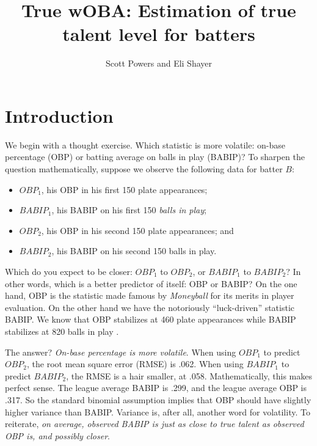 \documentclass[11pt]{article}
\title{True wOBA: Estimation of true talent level for batters}
\author{Scott Powers and Eli Shayer}
\begin{document}
\maketitle

\section{Introduction}
\label{sec-intro}

We begin with a thought exercise. Which statistic is more volatile:
on-base percentage (OBP) or batting average on balls in play (BABIP)? To
sharpen the question mathematically, suppose we observe the following data for
batter $B$:
\begin{itemize}
    \item $OBP_1$, his OBP in his first 150 plate appearances;
    \item $BABIP_1$, his BABIP on his first 150 {\it balls in play};
    \item $OBP_2$, his OBP in his second 150 plate appearances; and
    \item $BABIP_2$, his BABIP on his second 150 balls in play.
\end{itemize}
Which do you expect to be closer: $OBP_1$ to $OBP_2$, or $BABIP_1$ to
$BABIP_2$? In other words, which is a better predictor of itself: OBP or BABIP?
On the one hand, OBP is the statistic made famous by {\it Moneyball} for its
merits in player evaluation. On the other hand we have the notoriously
``luck-driven'' statistic BABIP. We know that OBP stabilizes at 460 plate
appearances while BABIP stabilizes at 820 balls in play \citep{Carleton12}.

The answer? {\it On-base percentage is more volatile}. When using $OBP_1$ to
predict $OBP_2$, the root mean square error (RMSE) is .062. When using
$BABIP_1$ to predict $BABIP_2$, the RMSE is a hair smaller, at .058.
Mathematically, this makes perfect sense. The league average BABIP is .299, and
the league average OBP is .317. So the standard binomial assumption implies
that OBP should have slightly higher variance than BABIP. Variance is, after
all, another word for volatility. To reiterate, {\it on average, observed BABIP
is just as close to true talent as observed OBP is, and possibly closer}.
\end{document}
